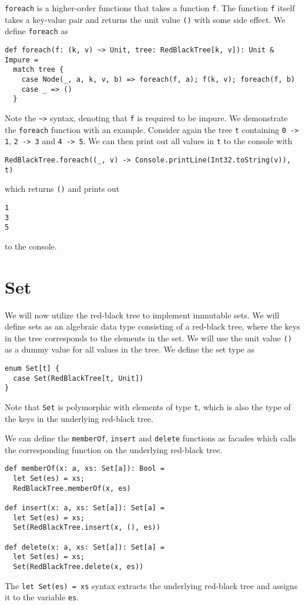 \documentclass[../main.tex]{subfiles}
\begin{document}
\lstinline{foreach} is a higher-order functions that takes a function \lstinline{f}. The function \lstinline{f} itself takes a key-value pair and returns the unit value \lstinline{()} with some side effect. We define \lstinline{foreach} as
\begin{lstlisting}[language=Flix]
def foreach(f: (k, v) ~> Unit, tree: RedBlackTree[k, v]): Unit & Impure =
  match tree {
    case Node(_, a, k, v, b) => foreach(f, a); f(k, v); foreach(f, b)
    case _ => ()
  }
\end{lstlisting}
Note the \lstinline{~>} syntax, denoting that \lstinline{f} is required to be impure. We demonstrate the \lstinline{foreach} function with an example. Consider again the tree \lstinline{t} containing \lstinline{0 -> 1}, \lstinline{2 -> 3} and \lstinline{4 -> 5}. We can then print out all values in \lstinline{t} to the console with
\begin{lstlisting}[language=Flix]
RedBlackTree.foreach((_, v) -> Console.printLine(Int32.toString(v)), t)
\end{lstlisting}
which returns \lstinline{()} and prints out
\begin{lstlisting}
1
3
5
\end{lstlisting}
to the console.

\section{Set} \label{set}

We will now utilize the red-black tree to implement immutable sets. We will define sets as an algebraic data type consisting of a red-black tree, where the keys in the tree corresponds to the elements in the set. We will use the unit value \lstinline{()} as a dummy value for all values in the tree. We define the set type as
\begin{lstlisting}[language=Flix]
enum Set[t] {
  case Set(RedBlackTree[t, Unit])
}
\end{lstlisting}
Note that \lstinline{Set} is polymorphic with elements of type \lstinline{t}, which is also the type of the keys in the underlying red-black tree.

We can define the \lstinline{memberOf}, \lstinline{insert} and \lstinline{delete} functions as facades which calls the corresponding function on the underlying red-black tree.
\begin{lstlisting}[language=Flix]
def memberOf(x: a, xs: Set[a]): Bool =
  let Set(es) = xs;
  RedBlackTree.memberOf(x, es)

def insert(x: a, xs: Set[a]): Set[a] =
  let Set(es) = xs;
  Set(RedBlackTree.insert(x, (), es))

def delete(x: a, xs: Set[a]): Set[a] =
  let Set(es) = xs;
  Set(RedBlackTree.delete(x, es))
\end{lstlisting}
The \lstinline{let Set(es) = xs} syntax extracts the underlying red-black tree and assigns it to the variable \lstinline{es}.
\end{document}
